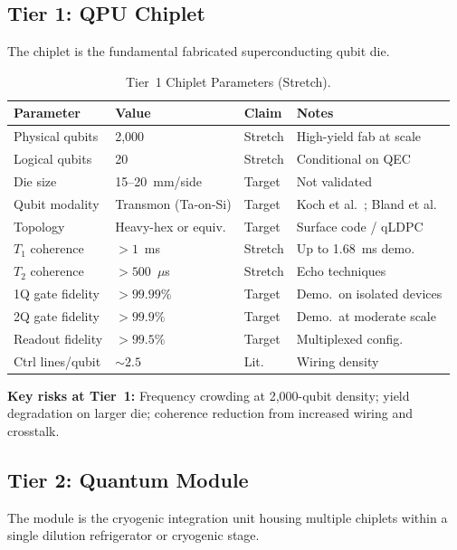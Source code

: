 \documentclass[conference]{IEEEtran}
\begin{document}
\subsection{Tier 1: QPU Chiplet}

The chiplet is the fundamental fabricated superconducting qubit die.

\begin{table}[htbp]
\centering
\caption{Tier~1 Chiplet Parameters (Stretch).}
\label{tab:chiplet}
\begin{tabular}{lllp{2.2cm}}
\toprule
\textbf{Parameter} & \textbf{Value} & \textbf{Claim} & \textbf{Notes} \\
\midrule
Physical qubits & 2,000 & Stretch & High-yield fab at scale \\
Logical qubits & 20 & Stretch & Conditional on QEC \\
Die size & 15--20~mm/side & Target & Not validated \\
Qubit modality & Transmon (Ta-on-Si) & Target & Koch et al.~\cite{koch2007}; Bland et al.~\cite{bland2025} \\
Topology & Heavy-hex or equiv. & Target & Surface code / qLDPC \\
$T_1$ coherence & $> 1$~ms & Stretch & Up to 1.68~ms demo.~\cite{bland2025} \\
$T_2$ coherence & $> 500$~$\mu$s & Stretch & Echo techniques \\
1Q gate fidelity & $> 99.99\%$ & Target & Demo.\ on isolated devices \\
2Q gate fidelity & $> 99.9\%$ & Target & Demo.\ at moderate scale~\cite{acharya2024} \\
Readout fidelity & $> 99.5\%$ & Target & Multiplexed config.\ \\
Ctrl lines/qubit & ${\sim}2.5$ & Lit.\ & Wiring density \\
\bottomrule
\end{tabular}
\end{table}

\textbf{Key risks at Tier~1:} Frequency crowding at 2,000-qubit density; yield degradation on larger die; coherence reduction from increased wiring and crosstalk.

\subsection{Tier 2: Quantum Module}

The module is the cryogenic integration unit housing multiple chiplets within a single dilution refrigerator or cryogenic stage.
\end{document}
